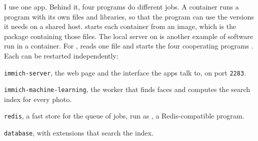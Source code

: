 \documentclass[11pt,a4paper]{article}
\begin{document}
I use one  app. Behind it, four programs do different jobs. A container runs a program with its own files and libraries, so that the program can use the versions it needs on a shared host.  starts each container from an image, which is the package containing those files. The local  server on  is another example of software run in a container. For ,  reads one file and starts the four cooperating programs \cite{immichcompose}. Each can be restarted independently:

\begin{compactitemize}
  \item \texttt{immich-server}, the web page and the interface the apps talk to, on port \texttt{2283}.
  \item \texttt{immich-machine-learning}, the worker that finds faces and computes the search index for every photo.
  \item \texttt{redis}, a fast store for the queue of jobs, run as , a Redis-compatible program.
  \item \texttt{database},  with extensions that search the index.
\end{compactitemize}
\end{document}

